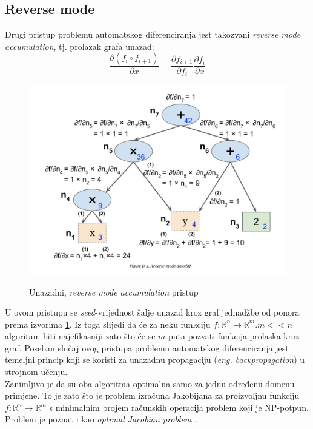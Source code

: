 \documentclass[zavrsnirad]{fer}
\begin{document}
\subsection{Reverse mode}
Drugi pristup problemu automatskog diferenciranja jest takozvani \textit{reverse mode accumulation}, tj. prolazak grafa unazad:
\begin{equation}
  \frac{\partial (f_i \circ f_{i+1})}{\partial x} = \frac{\partial f_{i+1}}{\partial f_i} \frac{\partial f_i}{\partial x}
\end{equation}
\begin{figure}[h]
  \centering
  \includegraphics[width=0.7\linewidth]{"./slike/reverse_graph.png"}
  \caption{Unazadni, \textit{reverse mode accumulation} pristup}
  \cite{srijithr_gitlab}
  \label{slk:reverse_graf}
\end{figure}
U ovom pristupu se \textit{seed}-vrijednost šalje unazad kroz graf jednadžbe od ponora prema izvorima \ref{slk:reverse_graf}. Iz toga slijedi da će za neku funkciju $f\colon \mathbb{R}^n \rightarrow \mathbb{R}^m. m << n$ algoritam biti najefikasniji zato što će se $m$ puta pozvati funkcija prolaska kroz graf. Poseban slučaj ovog pristupa problemu automatskog diferenciranja jest temeljni princip koji se koristi za unazadnu propagaciju (\textit{eng. backpropagation}) u strojnom učenju.
\\
Zanimljivo je da su oba algoritma optimalna samo za jednu određenu domenu primjene. To je zato što je problem izračuna Jakobijana za proizvoljnu funkciju $f\colon \mathbb{R}^n \rightarrow \mathbb{R}^m$ s minimalnim brojem računskih operacija problem koji je NP-potpun. Problem je poznat i kao \textit{optimal Jacobian problem} \cite{naumann:optimaljacobian}.
\end{document}
